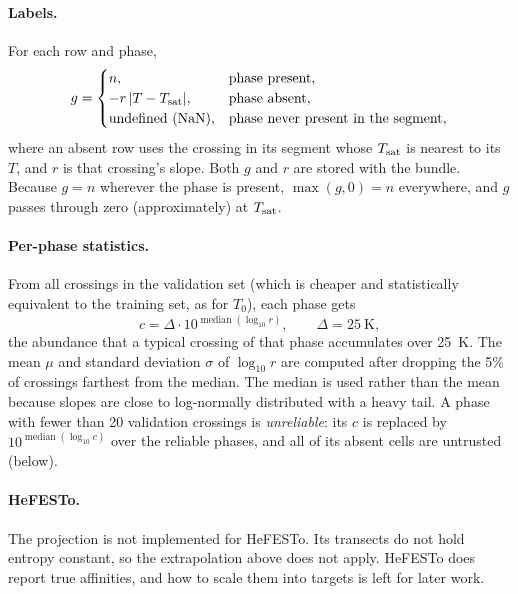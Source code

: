 \documentclass[11pt]{article}
\begin{document}
\paragraph{Labels.}
For each row and phase,
\begin{equation}
  g = \begin{cases}
    n, & \text{phase present},\\
    -r\,|T - T_{\rm sat}|, & \text{phase absent},\\
    \text{undefined (NaN)}, & \text{phase never present in the segment},
  \end{cases}
  \label{eq:glabel}
\end{equation}
where an absent row uses the crossing in its segment whose $T_{\rm sat}$ is nearest to its
$T$, and $r$ is that crossing's slope. Both $g$ and $r$ are stored with the bundle.
Because $g = n$ wherever the phase is present, $\max(g,0) = n$ everywhere, and $g$ passes
through zero (approximately) at $T_{\rm sat}$.

\paragraph{Per-phase statistics.}
From all crossings in the validation set (which is cheaper and statistically equivalent to
the training set, as for $T_0$), each phase gets
\begin{equation}
  c = \Delta \cdot 10^{\operatorname{median}(\log_{10} r)}, \qquad \Delta = 25~\text{K},
  \label{eq:c}
\end{equation}
the abundance that a typical crossing of that phase accumulates over 25~K. The mean $\mu$
and standard deviation $\sigma$ of $\log_{10} r$ are computed after dropping the 5\% of
crossings farthest from the median. The median is used rather than the mean because slopes
are close to log-normally distributed with a heavy tail. A phase with fewer than 20
validation crossings is \emph{unreliable}: its $c$ is replaced by $10^{\operatorname{median}(\log_{10} c)}$ over the
reliable phases, and all of its absent cells are untrusted (below).

\paragraph{HeFESTo.}
The projection is not implemented for HeFESTo. Its transects do not hold entropy constant,
so the extrapolation above does not apply. HeFESTo does report true affinities, and how to
scale them into targets is left for later work.
\end{document}
